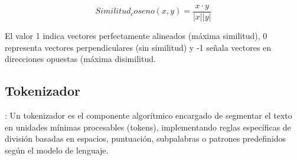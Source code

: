 \[Similitud_coseno(x,y) = \frac{x \cdot y}{|x||y|}\]

El valor 1 indica vectores perfectamente alineados (máxima similitud), 0 representa vectores perpendiculares (sin similitud) y -1 señala vectores en direcciones opuestas (máxima disimilitud.

\subsection{Tokenizador}
\label{anexo:tokenizer}: Un tokenizador es el componente algorítmico encargado de segmentar el texto en unidades mínimas procesables (tokens), implementando reglas específicas de división basadas en espacios, puntuación, subpalabras o patrones predefinidos según el modelo de lenguaje.


